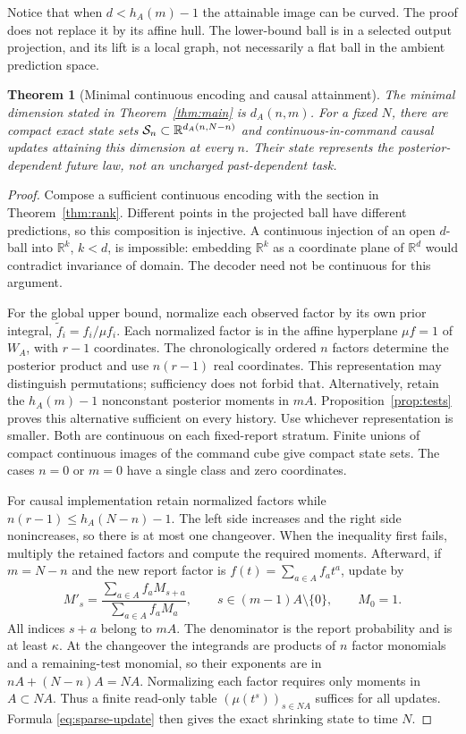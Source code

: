 \documentclass[11pt]{amsart}
\newtheorem{theorem}{Theorem}[section]
\theoremstyle{definition}\newtheorem{definition}[theorem]{Definition}
\theoremstyle{remark}\newtheorem{remark}[theorem]{Remark}
\newcommand{\R}{\mathbb R}\newcommand{\N}{\mathbb N}\newcommand{\C}{\mathbb C}
\begin{document}
Notice that when $d<h_A(m)-1$ the attainable image can be curved.
The proof does not replace it by its affine hull. The lower-bound ball
is in a selected output projection, and its lift is a local graph, not
necessarily a flat ball in the ambient prediction space.

\begin{theorem}[Minimal continuous encoding and causal attainment]\label{thm:causal}
The minimal dimension stated in Theorem~\ref{thm:main} is $d_A(n,m)$.
For a fixed $N$, there are compact exact state sets
$\cS_n\subset\R^{d_A(n,N-n)}$ and continuous-in-command causal updates
attaining this dimension at every $n$. Their state represents the
posterior-dependent future law, not an uncharged past-dependent task.
\end{theorem}
\begin{proof}
Compose a sufficient continuous encoding with the section in
Theorem~\ref{thm:rank}. Different points in the projected ball have
different predictions, so this composition is injective. A continuous
injection of an open $d$-ball into $\R^k$, $k<d$, is impossible: embedding
$\R^k$ as a coordinate plane of $\R^d$ would contradict invariance of
domain. The decoder need not be continuous for this argument.

For the global upper bound, normalize each observed factor by its own
prior integral, $\widetilde f_i=f_i/\mu f_i$. Each normalized factor is
in the affine hyperplane $\mu f=1$ of $W_A$, with $r-1$ coordinates.
The chronologically ordered $n$ factors determine the posterior product
and use $n(r-1)$ real coordinates. This representation may distinguish
permutations; sufficiency does not forbid that. Alternatively, retain the
$h_A(m)-1$ nonconstant posterior moments in $mA$.
Proposition~\ref{prop:tests} proves this alternative sufficient on every
history. Use whichever representation is smaller. Both are continuous on
each fixed-report stratum. Finite unions of compact continuous images of
the command cube give compact state sets. The cases $n=0$ or $m=0$
have a single class and zero coordinates.

For causal implementation retain normalized factors while
$n(r-1)\le h_A(N-n)-1$. The left side increases and the right side
nonincreases, so there is at most one changeover. When the inequality first
fails, multiply the retained factors and compute the required moments.
Afterward, if $m=N-n$ and the new report factor is
$f(t)=\sum_{a\in A}f_at^a$, update by
\begin{equation}\label{eq:sparse-update}
 M'_s=\frac{\sum_{a\in A}f_aM_{s+a}}{\sum_{a\in A}f_aM_a},
 \qquad s\in(m-1)A\setminus\{0\},\qquad M_0=1.
\end{equation}
All indices $s+a$ belong to $mA$. The denominator is the report
probability and is at least $\kappa$. At the changeover the integrands
are products of $n$ factor monomials and a remaining-test monomial,
so their exponents are in $nA+(N-n)A=NA$. Normalizing each factor
requires only moments in $A\subset NA$. Thus a finite read-only table
$(\mu(t^s))_{s\in NA}$ suffices for all updates. Formula
\eqref{eq:sparse-update} then gives the exact shrinking state to time $N$.
\end{proof}
\end{document}
